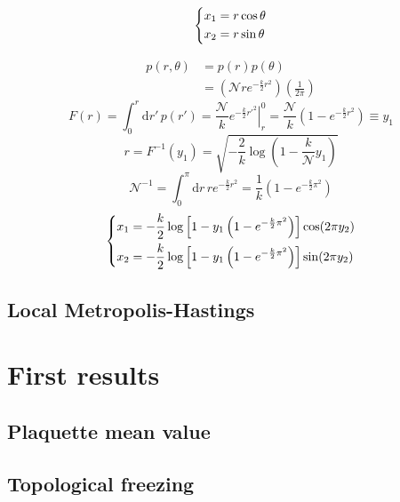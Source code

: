 \[\begin{dcases}
    x_1 = r \cos\theta \\
    x_2 = r \sin\theta \\
\end{dcases}\]

\[\begin{aligned}
    p(r,\theta) &= p(r)p(\theta) \\
                &= \left(\mathcal Nre^{-\frac{k}{2}r^2}\right)\left(\frac{1}{2\pi}\right)
\end{aligned}\]
\[
    F(r) = \int_0^r\mathrm dr'\,p(r') = \frac{\mathcal N}{k}\left.e^{-\frac{k}{2}{r'}^2}\right|_r^0 = \frac{\mathcal N}{k}\left(1-e^{-\frac{k}{2}r^2}\right) \equiv y_1
\]
\[
    r = F^{-1}(y_1) = \sqrt{-\frac{2}{k}\log\left(1-\frac{k}{\mathcal N}y_1\right)}
\]
\[
    \mathcal N^{-1} = \int_0^\pi\mathrm dr\,re^{-\frac{k}{2}r^2} = \frac{1}{k}\left(1-e^{-\frac{k}{2}\pi^2}\right)
\]
\begin{equation*}
    \begin{dcases}
        x_1 = -\frac{k}{2}\log\left[1-y_1\left(1-e^{-\frac{k}{2}\pi^2}\right)\right]\cos(2\pi y_2) \\
        x_2 = -\frac{k}{2}\log\left[1-y_1\left(1-e^{-\frac{k}{2}\pi^2}\right)\right]\sin(2\pi y_2)
    \end{dcases}
\end{equation*}

\subsection{Local Metropolis-Hastings}

\section{First results}

\subsection{Plaquette mean value}

\subsection{Topological freezing}

